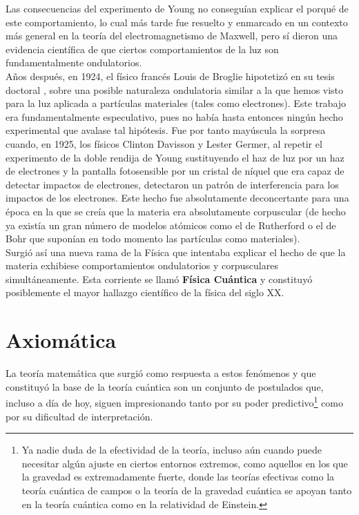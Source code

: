 \documentclass[11pt, spanish]{report}
\numberwithin{equation}{section}
\numberwithin{defin}{section}
\begin{document}
 Las consecuencias del experimento de Young no conseguían explicar el porqué de este comportamiento, lo cual más tarde fue resuelto y enmarcado en un contexto más general en la teoría del electromagnetismo de Maxwell, pero sí dieron una evidencia científica de que ciertos comportamientos de la luz son fundamentalmente ondulatorios.\\
 
Años después, en 1924, el físico francés Louis de Broglie hipotetizó en su tesis doctoral \cite{de1924recherches}, sobre una posible naturaleza ondulatoria similar a la que hemos visto para la luz aplicada a partículas materiales (tales como electrones). Este trabajo era fundamentalmente especulativo, pues no había hasta entonces ningún hecho experimental que avalase tal hipótesis. Fue por tanto mayúscula la sorpresa cuando, en 1925, los físicos Clinton Davisson y Lester Germer, al repetir el experimento de la doble rendija de Young sustituyendo el haz de luz por un haz de electrones \cite{davisson1927diffraction} y la pantalla fotosensible por un cristal de níquel que era capaz de detectar impactos de electrones, detectaron un patrón de interferencia para los impactos de los electrones. Este hecho fue absolutamente deconcertante para una época en la que se creía que la materia era absolutamente corpuscular (de hecho ya existía un gran número de modelos atómicos como el de Rutherford o el de Bohr que suponían en todo momento las partículas como materiales). \\

Surgió así una nueva rama de la Física que intentaba explicar el hecho de que la materia exhibiese comportamientos ondulatorios y corpusculares simultáneamente. Esta corriente se llamó \textbf{Física Cuántica} y constituyó posiblemente el mayor hallazgo científico de la física del siglo XX.


\section{Axiomática}

La teoría matemática que surgió como respuesta a estos fenómenos y que constituyó la base de la teoría cuántica son un conjunto de postulados que, incluso a día de hoy, siguen impresionando tanto por su poder predictivo\footnote{Ya nadie duda de la efectividad de la teoría, incluso aún cuando puede necesitar algún ajuste en ciertos entornos extremos, como aquellos en los que la gravedad es extremadamente fuerte, donde las teorías efectivas como la teoría cuántica de campos o la teoría de la gravedad cuántica se apoyan tanto en la teoría cuántica como en la relatividad de Einstein.} como por su dificultad de interpretación.\\
\end{document}
